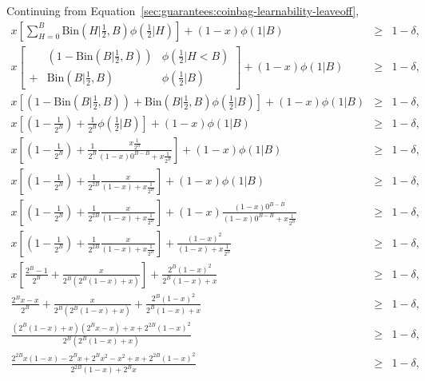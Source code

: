 
Continuing from Equation~\ref{sec:guarantees:coinbag-learnability-leaveoff},
\begin{eqnarray}
x
\left[
 \sum_{H=0}^B
  \mbox{Bin}(H|\frac 1 2,B)
 \phi(\frac 1 2|H)
\right]
+(1-x)
\phi(1|B)
&\geq& 1-\delta,\\
%
x
\left[
\begin{array}{lll}
 &(1-\mbox{Bin}(B|\frac 1 2, B))& \phi(\frac 1 2|H<B)\\
 +&\mbox{Bin}(B|\frac 1 2, B)& \phi(\frac 1 2|B)
\end{array}
\right]
+(1-x)
\phi(1|B)
&\geq& 1-\delta,\\
%
x
\left[
 (1-\mbox{Bin}(B|\frac 1 2, B))
 +\mbox{Bin}(B|\frac 1 2, B) \phi(\frac 1 2|B)
\right]
+(1-x)
\phi(1|B)
&\geq& 1-\delta,\\
%
x
\left[
 \left(1-\frac 1 {2^B}\right)
 +\frac 1 {2^B} \phi(\frac 1 2|B)
\right]
+(1-x)
\phi(1|B)
&\geq& 1-\delta,\\
%
x
\left[
 \left(1-\frac 1 {2^B}\right)
 +\frac 1 {2^B} \frac
{x \frac 1 {2^B}}
{(1-x)0^{B-B}+x \frac 1 {2^B}}
\right]
+(1-x)
\phi(1|B)
&\geq& 1-\delta,\\
%
x
\left[
 \left(1-\frac 1 {2^B}\right)
 +\frac 1 {2^{2B}} \frac
{x }
{(1-x)+x \frac 1 {2^B}}
\right]
+(1-x)
\phi(1|B)
&\geq& 1-\delta,\\
%
x
\left[
 \left(1-\frac 1 {2^B}\right)
 +\frac 1 {2^{2B}} \frac
{x }
{(1-x)+x \frac 1 {2^B}}
\right]
+(1-x)
\frac
{(1-x)0^{B-B}}
{(1-x)0^{B-B}+x \frac 1 {2^B}}
&\geq& 1-\delta,\\
%
x
\left[
 \left(1-\frac 1 {2^B}\right)
 +\frac 1 {2^{2B}} \frac
{x }
{(1-x)+x \frac 1 {2^B}}
\right]
+
\frac
{(1-x)^2}
{(1-x)+x \frac 1 {2^B}}
&\geq& 1-\delta,\\
%
x
\left[
 \frac {2^B-1} {2^B}
 +\frac
   {x}
   {2^B(2^B(1-x)+x)}
\right]
+
\frac
 {2^B (1-x)^2}
 {2^B (1-x)+x}
&\geq& 1-\delta,\\
%
 \frac
  {2^Bx-x}
  {2^B}
 +
 \frac
  {x}
  {2^B(2^B(1-x)+x)}
 +
 \frac
  {2^B (1-x)^2}
  {2^B (1-x)+x}
&\geq& 1-\delta,\\
%
 \frac
  {(2^B (1-x)+x)(2^Bx-x)
   +{x}
   +{2^{2B} (1-x)^2}}
  {2^B(2^B(1-x)+x)}
&\geq& 1-\delta,\\
%
 \frac
  {2^{2B}x (1-x)-2^Bx+2^Bx^2-x^2
   +{x}
   +{2^{2B} (1-x)^2}}
  {2^{2B}(1-x)+2^Bx}
&\geq& 1-\delta,\\

\end{eqnarray}
